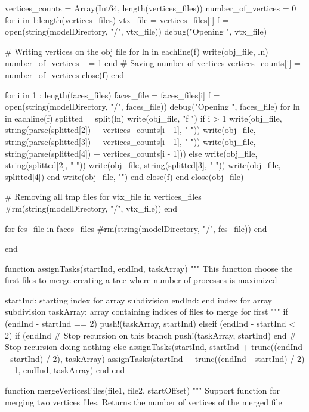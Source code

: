 \documentclass[11pt,oneside]{article}	%
\begin{document}
{  vertices_counts = Array(Int64, length(vertices_files))
  number_of_vertices = 0
  for i in 1:length(vertices_files)
    vtx_file = vertices_files[i]
    f = open(string(modelDirectory, "/", vtx_file))
    debug("Opening ", vtx_file)

    # Writing vertices on the obj file
    for ln in eachline(f)
      write(obj_file, ln)
      number_of_vertices += 1
    end
    # Saving number of vertices
    vertices_counts[i] = number_of_vertices
    close(f)
  end

  for i in 1 : length(faces_files)
    faces_file = faces_files[i]
    f = open(string(modelDirectory, "/", faces_file))
    debug("Opening ", faces_file)
    for ln in eachline(f)
      splitted = split(ln)
      write(obj_file, "f ")
      if i > 1
        write(obj_file, string(parse(splitted[2]) + vertices_counts[i - 1], " "))
        write(obj_file, string(parse(splitted[3]) + vertices_counts[i - 1], " "))
        write(obj_file, string(parse(splitted[4]) + vertices_counts[i - 1]))
      else
        write(obj_file, string(splitted[2], " "))
        write(obj_file, string(splitted[3], " "))
        write(obj_file, splitted[4])
      end
      write(obj_file, "\n")
    end
    close(f)
  end
  close(obj_file)

  # Removing all tmp files
  for vtx_file in vertices_files
    #rm(string(modelDirectory, "/", vtx_file))
  end

  for fcs_file in faces_files
    #rm(string(modelDirectory, "/", fcs_file))
  end

end

function assignTasks(startInd, endInd, taskArray)
  """
  This function choose the first files to merge
  creating a tree where number of processes is maximized

  startInd: starting index for array subdivision
  endInd: end index for array subdivision
  taskArray: array containing indices of files to merge for first
  """
  if (endInd - startInd == 2)
    push!(taskArray, startInd)
  elseif (endInd - startInd < 2)
    if (endInd %
      # Stop recursion on this branch
      push!(taskArray, startInd)
    end
    # Stop recursion doing nothing
  else
    assignTasks(startInd, startInd + trunc((endInd - startInd) / 2), taskArray)
    assignTasks(startInd + trunc((endInd - startInd) / 2) + 1, endInd, taskArray)
  end
end

function mergeVerticesFiles(file1, file2, startOffset)
  """
  Support function for merging two vertices files.
  Returns the number of vertices of the merged file

}
\end{document}
